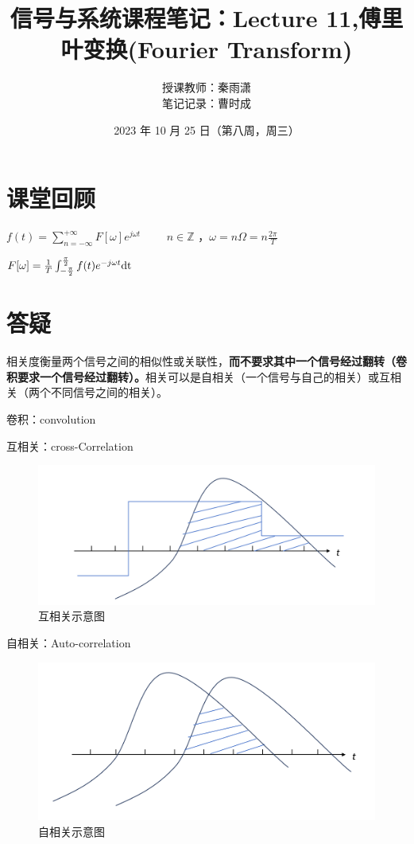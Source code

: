 \documentclass[UTF8]{ctexart}
\begin{document}
\title{信号与系统课程笔记：Lecture 11,傅里叶变换(Fourier Transform) }
\author{授课教师：秦雨潇 \\
        笔记记录：曹时成}
\date{2023 年 10 月 25 日（第八周，周三）}
\maketitle

\section{课堂回顾}
$f(t)=\sum_{n=-\infty}^{+\infty}F[\omega]e^{j\omega{t}}\qquad$ $n\in \mathbb{Z}$ ，$\omega=n\Omega=n\frac{2\pi}{T}  $ \par
$F[\omega]=\frac{1}{T}\int_{-\frac{\pi}{2}}^{\frac{\pi}{2}}f(t)e^{-j\omega{t}}{\rm{dt}}$ \par
\section{答疑}
相关度衡量两个信号之间的相似性或关联性，\textbf{而不要求其中一个信号经过翻转（卷积要求一个信号经过翻转）。}相关可以是自相关（一个信号与自己的相关）或互相关（两个不同信号之间的相关）。\par
卷积：convolution \par
互相关：cross-Correlation \par
\begin{figure}[h]
    \centering         %
    \includegraphics[scale=0.5]{1.jpg}
    \caption{互相关示意图}
\end{figure}
\; \par
\; \par
\; \par
自相关：Auto-correlation \par
\begin{figure}[h]
    \centering         %
    \includegraphics[scale=0.5]{2.png}
    \caption{自相关示意图}
\end{figure}
\end{document}
